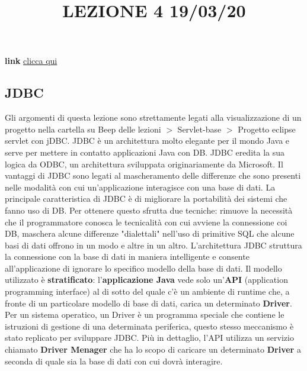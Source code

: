 \title{LEZIONE 4 19/03/20}\newline
\textbf{link} \href{https://web.microsoftstream.com/video/53d9a40e-3109-44fc-8195-0553eedfb6d9}{clicca qui}
\subsection{JDBC}
Gli argomenti di questa lezione sono strettamente legati alla visualizzazione di un progetto nella cartella su Beep delle lezioni $>$ Servlet-base $>$ Progetto eclipse servlet con jDBC.\newline
\newline
JDBC è un architettura molto elegante per il mondo Java e serve per mettere in contatto applicazioni Java con DB.\newline
JDBC eredita la sua logica da ODBC, un architettura sviluppata originariamente da Microsoft.\newline
\newline
Il vantaggi di JDBC sono legati al mascheramento delle differenze che sono presenti nelle modalità con cui un'applicazione interagisce con una base di dati.\newline
La principale caratteristica di JDBC è di migliorare la portabilità dei sistemi che fanno uso di DB. Per ottenere questo sfrutta due tecniche: rimuove la necessità che il programmatore conosca le tecnicalità con cui avviene la connessione coi DB, maschera alcune differenze "dialettali" nell'uso di primitive SQL che alcune basi di dati offrono in un modo e altre in un altro.\newline
\newline
L'architettura JDBC struttura la connessione con la base di dati in maniera intelligente e consente all'applicazione di ignorare lo specifico modello della base di dati.\newline
Il modello utilizzato è \textbf{stratificato}: l'\textbf{applicazione Java} vede solo un'\textbf{API} (application programming interface) al di sotto del quale c'è un ambiente di runtime che, a fronte di un particolare modello di base di dati, carica un determinato \textbf{Driver}. Per un sistema operatico, un Driver è un programma speciale che contiene le istruzioni di gestione di una determinata periferica, questo stesso meccanismo è stato replicato per sviluppare JDBC.\newline
\newline
Più in dettaglio, l'API utilizza un servizio chiamato \textbf{Driver Menager} che ha lo scopo di caricare un determinato \textbf{Driver} a seconda di quale sia la base di dati con cui dovrà interagire.\newline
